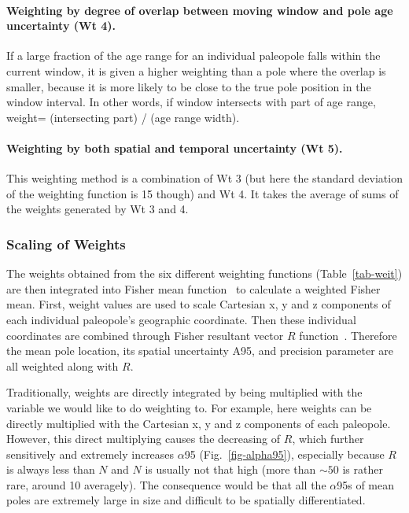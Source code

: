 \paragraph{Weighting by degree of overlap between moving window and pole age
uncertainty (Wt 4).} If a large fraction of the age range for an individual
paleopole falls within the current window, it is given a higher weighting than a
pole where the overlap is smaller, because it is more likely to be close to the
true pole position in the window interval. In other words, if window intersects
with part of age range, weight= (intersecting part) / (age range width).

\paragraph{Weighting by both spatial and temporal uncertainty (Wt 5).} This
weighting method is a combination of Wt 3 (but here the standard deviation of
the weighting function is 15 though) and Wt 4. It takes the average of sums of
the weights generated by Wt 3 and 4.

\subsubsection{Scaling of Weights}

The weights obtained from the six different weighting functions
(Table~\ref{tab-weit}) are then integrated into Fisher mean function~\citep{F53}
to calculate a weighted Fisher mean. First, weight values are used to scale
Cartesian x, y and z components of each individual paleopole's geographic
coordinate. Then these individual coordinates are combined through Fisher
resultant vector $R$ function~\citep[see][chap.~11]{T19}. Therefore the mean
pole location, its spatial uncertainty A95, and precision parameter are all
weighted along with $R$.

Traditionally, weights are directly integrated by being multiplied with the
variable we would like to do weighting to. For example, here weights can be
directly multiplied with the Cartesian x, y and z components of each paleopole.
However, this direct multiplying causes the decreasing of $R$, which further
sensitively and extremely increases $\alpha$95 (Fig.~\ref{fig-alpha95}),
especially because $R$ is always less than $N$ and $N$ is usually not that high
(more than ${\sim}50$ is rather rare, around 10 averagely). The consequence
would be that all the $\alpha$95s of mean poles are extremely large in size and
difficult to be spatially differentiated.

